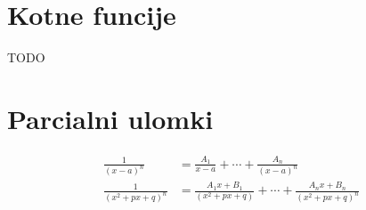 \documentclass[a4paper,12pt]{article}
\begin{document}
\tableofcontents
\section{Kotne funcije}
TODO
\section{Parcialni ulomki}


\begin{align*}
    \frac{1}{(x-a)^n} &= \frac{A_1}{x-a} + \cdots + \frac{A_n}{(x-a)^n} \\
    \frac{1}{(x^2 + px + q)^n} &= \frac{A_1x + B_1}{(x^2 + px + q)} + \cdots + \frac{A_nx + B_n}{(x^2 + px + q)^n}
\end{align*}
\end{document}
